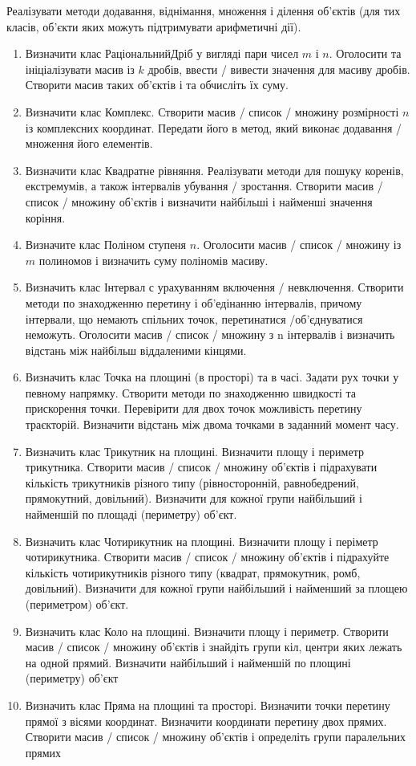 \documentclass[]{article}
\begin{document}
Реалізувати методи додавання, віднімання, множення і ділення об'єктів (для тих класів, об'єкти яких можуть підтримувати арифметичні дії).
\begin{enumerate}
\def\labelenumi{3.\arabic{enumi}.}
\item
Визначити клас РаціональнийДріб у вигляді пари чисел $m$ і $n$. Оголосити та ініціалізувати масив із $k$ дробів, ввести / вивести значення для масиву дробів. Створити масив таких об'єктів і та обчисліть їх суму.
\item
Визначити клас Комплекс. Створити масив / список / множину розмірності $n$ із комплексних координат. Передати його в метод, який виконає додавання / множення його елементів.
\item
 Визначити клас Квадратне рівняння. Реалізувати методи для пошуку коренів, екстремумів, а також інтервалів убування / зростання. Створити масив / список / множину об'єктів і визначити найбільші і найменші значення коріння.
\item
Визначите клас Поліном ступеня $n$. Оголосити масив / список / множину із $m$ полиномов і визначить суму поліномів масиву.
\item
Визначить клас Інтервал с урахуванням включення / невключення. Створити методи по знаходженню перетину і об'едінанню інтервалів, причому інтервали, що немають спільних точок, перетинатися /об'єднуватися неможуть. Оголосити масив / список / множину з n інтервалів і визначить відстань між найбільш віддаленими кінцями.
\item
Визначить клас Точка на площині (в просторі) та в часі. Задати рух точки у певному напрямку. Створити методи по знаходженню швидкості та прискорення точки. Перевірити для двох точок можливість перетину траєкторій. Визначити відстань між двома точками в заданний момент часу.
\item
Визначить клас Трикутник на площині. Визначити площу і периметр трикутника. Створити масив / список / множину об'єктів і підрахувати кількість трикутників різного типу (рівносторонній, равнобедрений, прямокутний, довільний). Визначити для кожної групи найбільший і найменшій по площаді (периметру) об'єкт.
\item

Визначить клас Чотирикутник на площині. Визначити площу і періметр чотирикутника. Створити масив / список / множину об'єктів і підрахуйте кількість чотирикутників різного типу (квадрат, прямокутник, ромб, довільний). Визначити для кожної групи найбільший і найменший за площею (периметром) об'єкт.
\item
Визначить клас Коло на площині. Визначити площу і периметр. Створити масив / список / множину об'єктів і знайдіть групи кіл, центри яких лежать на одной прямий. Визначити найбільший і найменшій по площині (периметру) об'єкт
\item  Визначить клас Пряма на площині та просторі. Визначити точки перетину прямої з вісями координат. Визначити координати перетину двох прямих. Створити масив / список / множину об'єктів і определіть групи паралельних прямих
\end{enumerate}
\end{document}
